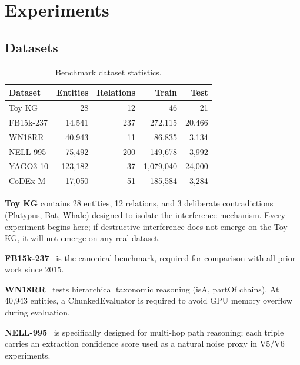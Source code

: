 \documentclass[runningheads]{llncs}
\begin{document}
\section{Experiments}
\label{sec:experiment}

\subsection{Datasets}

\begin{table}[t]
\caption{Benchmark dataset statistics.}
\label{tab:datasets}
\centering
\begin{tabular}{lrrrr}
\toprule
Dataset      & Entities   & Relations & Train       & Test    \\
\midrule
Toy KG       & 28         & 12        & 46          & 21      \\
FB15k-237    & 14{,}541   & 237       & 272{,}115   & 20{,}466\\
WN18RR       & 40{,}943   & 11        & 86{,}835    & 3{,}134 \\
NELL-995     & 75{,}492   & 200       & 149{,}678   & 3{,}992 \\
YAGO3-10     & 123{,}182  & 37        & 1{,}079{,}040 & 24{,}000\\
CoDEx-M      & 17{,}050   & 51        & 185{,}584   & 3{,}284 \\
\bottomrule
\end{tabular}
\end{table}

\textbf{Toy KG} contains 28 entities, 12 relations, and 3 deliberate
contradictions (Platypus, Bat, Whale) designed to isolate the interference
mechanism.  Every experiment begins here; if destructive interference does
not emerge on the Toy KG, it will not emerge on any real dataset.

\textbf{FB15k-237}~\cite{ref_fb15k237} is the canonical benchmark, required
for comparison with all prior work since 2015.

\textbf{WN18RR}~\cite{ref_wn18rr} tests hierarchical taxonomic reasoning
(isA, partOf chains).  At 40,943 entities, a ChunkedEvaluator is required
to avoid GPU memory overflow during evaluation.

\textbf{NELL-995}~\cite{ref_nell} is specifically designed for multi-hop
path reasoning; each triple carries an extraction confidence score used as a
natural noise proxy in V5/V6 experiments.
\end{document}
